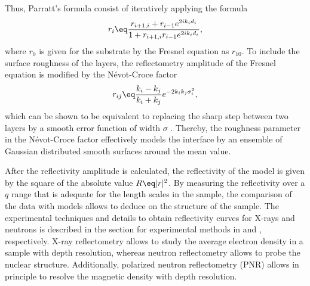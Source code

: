 \documentclass[\main/dresen_thesis.tex]{subfiles}
\begin{document}
    Thus, Parratt's formula consist of iteratively applying the formula
    \begin{align}
      r_{i} \eq \frac{r_{i+1,i} + r_{i-1} e^{2 i k_i d_i}} {1 + r_{i+1,i} r_{i-1} e^{2 i k_i d_i}},
    \end{align}
    where $r_0$ is given for the substrate by the Fresnel equation as $r_{10}$.
    To include the surface roughness of the layers, the reflectometry amplitude of the Fresnel equation is modified by the Névot-Croce factor \cite{Nevot_1980_Carac}
    \begin{align}
      r_{ij} \eq \frac{k_i - k_j}{k_i+k_j} e^{-2 k_i k_j \sigma_i^2},\\
    \end{align}
    which can be shown to be equivalent to replacing the sharp step between two layers by a smooth error function of width $\sigma$ \cite{Tolan_1999_XRaySc}.
    Thereby, the roughness parameter in the Névot-Croce factor effectively models the interface by an ensemble of Gaussian distributed smooth surfaces around the mean value.

    After the reflectivity amplitude is calculated, the reflectivity of the model is given by the square of the absolute value $R \eq |r|^2$.
    By measuring the reflectivity over a $q$ range that is adequate for the length scales in the sample, the comparison of the data with models allows to deduce on the structure of the sample.
    The experimental techniques and details to obtain reflectivity curves for X-rays and neutrons is described in the section for experimental methods in  and , respectively.
    X-ray reflectometry allows to study the average electron density in a sample with depth resolution, whereas neutron reflectometry allows to probe the nuclear structure.
    Additionally, polarized neutron reflectometry (PNR) allows in principle to resolve the magnetic density with depth resolution.
\end{document}
